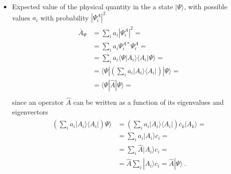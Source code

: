 \documentclass[letterpaper,10pt,english]{jupyterBook}
\begin{document}
\begin{itemize}
\item {} 
\sphinxAtStartPar
Expected value of the physical quantity in the a state \(|\Psi\rangle\), with possible values \(a_i\) with probability \(|\Psi_i^A|^2\)
\begin{equation*}
\begin{split}\begin{aligned}
    \bar{A}_{\Psi} & = \sum_i a_i |\Psi_i^A|^2 = \\
            & = \sum_i a_i \Psi_i^{A*} \Psi_i^A =  \\ 
            & = \sum_i a_i \langle \Psi | A_i \rangle \langle A_i | \Psi \rangle = \\
            & = \langle \Psi | \left( \sum_i a_i | A_i \rangle \langle A_i | \right) | \Psi \rangle = \\
            & = \langle \Psi | \hat{A} | \Psi \rangle = \\
  \end{aligned}\end{split}
\end{equation*}
\sphinxAtStartPar
since an operator \(\hat{A}\) can be written as a function of its eigenvalues and eigenvectors
\begin{equation*}
\begin{split}\begin{aligned}
   \left( \sum_i a_i | A_i \rangle \langle A_i | \right) \Psi \rangle 
   & = \left( \sum_i a_i | A_i \rangle \langle A_i | \right) c_k | A_k \rangle = \\
   & =  \sum_i a_i | A_i \rangle c_i = \\
   & =  \sum_i \hat{A} | A_i \rangle c_i = \\
   & = \hat{A} \sum_i | A_i \rangle c_i = \hat{A} | \Psi \rangle \ . 
   \end{aligned}\end{split}
\end{equation*}
\end{itemize}
\end{document}
